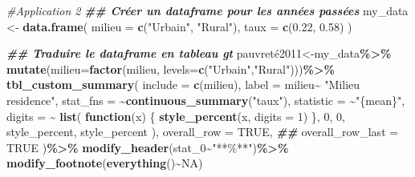 \documentclass[
]{article}
\newenvironment{Shaded}{\begin{snugshade}}{\end{snugshade}}
\newcommand{\AttributeTok}[1]{\textcolor[rgb]{0.13,0.29,0.53}{#1}}
\newcommand{\CommentTok}[1]{\textcolor[rgb]{0.56,0.35,0.01}{\textit{#1}}}
\newcommand{\ConstantTok}[1]{\textcolor[rgb]{0.56,0.35,0.01}{#1}}
\newcommand{\ControlFlowTok}[1]{\textcolor[rgb]{0.13,0.29,0.53}{\textbf{#1}}}
\newcommand{\DecValTok}[1]{\textcolor[rgb]{0.00,0.00,0.81}{#1}}
\newcommand{\DocumentationTok}[1]{\textcolor[rgb]{0.56,0.35,0.01}{\textbf{\textit{#1}}}}
\newcommand{\FloatTok}[1]{\textcolor[rgb]{0.00,0.00,0.81}{#1}}
\newcommand{\FunctionTok}[1]{\textcolor[rgb]{0.13,0.29,0.53}{\textbf{#1}}}
\newcommand{\NormalTok}[1]{#1}
\newcommand{\OtherTok}[1]{\textcolor[rgb]{0.56,0.35,0.01}{#1}}
\newcommand{\SpecialCharTok}[1]{\textcolor[rgb]{0.81,0.36,0.00}{\textbf{#1}}}
\newcommand{\StringTok}[1]{\textcolor[rgb]{0.31,0.60,0.02}{#1}}
\begin{document}
\begin{Shaded}
\begin{Highlighting}[]
\CommentTok{\#Application 2}
\DocumentationTok{\#\# Créer un dataframe pour les années passées}
\NormalTok{my\_data }\OtherTok{\textless{}{-}} \FunctionTok{data.frame}\NormalTok{(}
  \AttributeTok{milieu =} \FunctionTok{c}\NormalTok{(}\StringTok{"Urbain"}\NormalTok{, }\StringTok{"Rural"}\NormalTok{),}
  \AttributeTok{taux =} \FunctionTok{c}\NormalTok{(}\FloatTok{0.22}\NormalTok{, }\FloatTok{0.58}\NormalTok{)}
\NormalTok{)}

\DocumentationTok{\#\# Traduire le dataframe en tableau gt}
\NormalTok{pauvreté2011}\OtherTok{\textless{}{-}}\NormalTok{my\_data}\SpecialCharTok{\%\textgreater{}\%}
  \FunctionTok{mutate}\NormalTok{(}\AttributeTok{milieu=}\FunctionTok{factor}\NormalTok{(milieu, }\AttributeTok{levels=}\FunctionTok{c}\NormalTok{(}\StringTok{"Urbain"}\NormalTok{,}\StringTok{"Rural"}\NormalTok{)))}\SpecialCharTok{\%\textgreater{}\%}
  \FunctionTok{tbl\_custom\_summary}\NormalTok{(}
  \AttributeTok{include =} \FunctionTok{c}\NormalTok{(milieu), }\AttributeTok{label =}\NormalTok{ milieu}\SpecialCharTok{\textasciitilde{}} \StringTok{"Milieu residence"}\NormalTok{,}
  \AttributeTok{stat\_fns =} \SpecialCharTok{\textasciitilde{}}\FunctionTok{continuous\_summary}\NormalTok{(}\StringTok{"taux"}\NormalTok{),}
  \AttributeTok{statistic =} \SpecialCharTok{\textasciitilde{}}\StringTok{"\{mean\}"}\NormalTok{,}
  \AttributeTok{digits =} \SpecialCharTok{\textasciitilde{}} \FunctionTok{list}\NormalTok{(}
      \ControlFlowTok{function}\NormalTok{(x) \{}
        \FunctionTok{style\_percent}\NormalTok{(x, }\AttributeTok{digits =} \DecValTok{1}\NormalTok{)}
\NormalTok{      \},}
      \DecValTok{0}\NormalTok{, }\DecValTok{0}\NormalTok{, style\_percent, style\_percent}
\NormalTok{    ),}
  \AttributeTok{overall\_row =} \ConstantTok{TRUE}\NormalTok{,  }\DocumentationTok{\#\#}
  \AttributeTok{overall\_row\_last =} \ConstantTok{TRUE}
\NormalTok{)}\SpecialCharTok{\%\textgreater{}\%}
  \FunctionTok{modify\_header}\NormalTok{(stat\_0}\SpecialCharTok{\textasciitilde{}}\StringTok{"**\%**"}\NormalTok{)}\SpecialCharTok{\%\textgreater{}\%}
  \FunctionTok{modify\_footnote}\NormalTok{(}\FunctionTok{everything}\NormalTok{()}\SpecialCharTok{\textasciitilde{}}\ConstantTok{NA}\NormalTok{)}


\end{Highlighting}
\end{Shaded}
\end{document}
